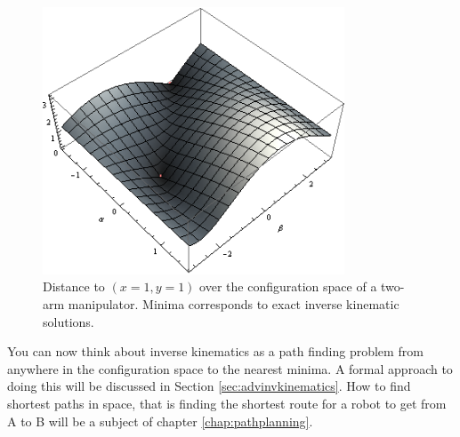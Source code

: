 \begin{figure}
	\centering
		\includegraphics[width=0.8\textwidth]{figs/inversekinematics}
	\caption{Distance to $(x=1,y=1)$ over the configuration space of a two-arm manipulator. Minima corresponds to exact inverse kinematic solutions.}
	\label{fig:inversekinematics}
\end{figure}

You can now think about inverse kinematics as a path finding problem from anywhere in the configuration space to the nearest minima. A formal approach to doing this will be discussed in Section \ref{sec:advinvkinematics}. How to find shortest paths in space, that is finding the shortest route for a robot to get from A to B will be a subject of chapter \ref{chap:pathplanning}.
